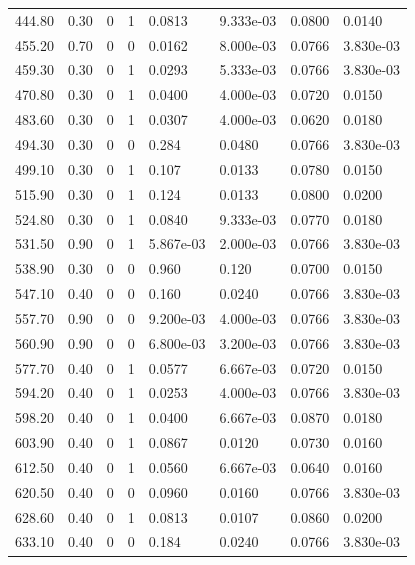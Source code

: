 \documentclass[preview]{standalone}
\begin{document}
{{{\begin{tabular}{L{1.2cm}C{1.2cm} C{0.3cm}C{0.5cm} C{1.4cm}C{1.4cm} C{1.4cm}C{1.4cm}}
  444.80  &  0.30  & 0     &  1 &  0.0813  & 9.333e-03  & 0.0800 &  0.0140   \\ 
  455.20  &  0.70  & 0     &  0 &  0.0162  & 8.000e-03  & 0.0766 &  3.830e-03   \\ 
  459.30  &  0.30  & 0     &  1 &  0.0293  & 5.333e-03  & 0.0766 &  3.830e-03   \\ 
  470.80  &  0.30  & 0     &  1 &  0.0400  & 4.000e-03  & 0.0720 &  0.0150   \\ 
  483.60  &  0.30  & 0     &  1 &  0.0307  & 4.000e-03  & 0.0620 &  0.0180   \\ 
  494.30  &  0.30  & 0     &  0 &  0.284  & 0.0480  & 0.0766 &  3.830e-03   \\ 
  499.10  &  0.30  & 0     &  1 &  0.107  & 0.0133  & 0.0780 &  0.0150   \\ 
  515.90  &  0.30  & 0     &  1 &  0.124  & 0.0133  & 0.0800 &  0.0200   \\ 
  524.80  &  0.30  & 0     &  1 &  0.0840  & 9.333e-03  & 0.0770 &  0.0180   \\ 
  531.50  &  0.90  & 0     &  1 &  5.867e-03  & 2.000e-03  & 0.0766 &  3.830e-03   \\ 
  538.90  &  0.30  & 0     &  0 &  0.960  & 0.120  & 0.0700 &  0.0150   \\ 
  547.10  &  0.40  & 0     &  0 &  0.160  & 0.0240  & 0.0766 &  3.830e-03   \\ 
  557.70  &  0.90  & 0     &  0 &  9.200e-03  & 4.000e-03  & 0.0766 &  3.830e-03   \\ 
  560.90  &  0.90  & 0     &  0 &  6.800e-03  & 3.200e-03  & 0.0766 &  3.830e-03   \\ 
  577.70  &  0.40  & 0     &  1 &  0.0577  & 6.667e-03  & 0.0720 &  0.0150   \\ 
  594.20  &  0.40  & 0     &  1 &  0.0253  & 4.000e-03  & 0.0766 &  3.830e-03   \\ 
  598.20  &  0.40  & 0     &  1 &  0.0400  & 6.667e-03  & 0.0870 &  0.0180   \\ 
  603.90  &  0.40  & 0     &  1 &  0.0867  & 0.0120  & 0.0730 &  0.0160   \\ 
  612.50  &  0.40  & 0     &  1 &  0.0560  & 6.667e-03  & 0.0640 &  0.0160   \\ 
  620.50  &  0.40  & 0     &  0 &  0.0960  & 0.0160  & 0.0766 &  3.830e-03   \\ 
  628.60  &  0.40  & 0     &  1 &  0.0813  & 0.0107  & 0.0860 &  0.0200   \\ 
  633.10  &  0.40  & 0     &  0 &  0.184  & 0.0240  & 0.0766 &  3.830e-03   \\ 

\end{tabular}}}}
\end{document}
